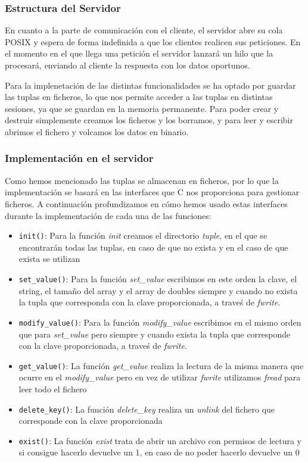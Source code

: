 \documentclass[]{article}
\begin{document}
\subsubsection{Estructura del Servidor}
\label{subsec::estructura_servidor}
En cuanto a la parte de comunicación con el cliente, el servidor abre su cola POSIX y espera de forma indefinida a que los clientes realicen sus peticiones. En el momento en el que llega una petición el servidor lanzará un hilo que la procesará, enviando al cliente la respuesta con los datos oportunos.

Para la implenetación de las distintas funcionalidades se ha optado por guardar las tuplas en ficheros, lo que nos permite acceder a las tuplas en distintas sesiones, ya que se guardan en la memoria permanente.
Para poder crear y destruir simplemente creamos los ficheros y los borramos, y para leer y escribir abrimos el fichero y volcamos los datos en binario.

\subsubsection{Implementación en el servidor}
\label{subsec::implementacion_servidor}
Como hemos mencionado las tuplas se almacenan en ficheros, por lo que la implementación se basará en las interfaces que C nos proporciona para gestionar ficheros.
A continuación profundizamos en cómo hemos usado estas interfaces durante la implementación de cada una de las funciones:

\begin{itemize}
  \item \texttt{init()}: Para la función \textit{init} creamos el directorio \textit{tuple}, en el que se encontrarán todas las tuplas, en caso de que no exista y en el caso de que exista se utilizan 
  \item \texttt{set\_value()}: Para la función \textit{set\_value} escribimos en este orden la clave, el string, el tamaño del array y el array de doubles siempre y cuando no exista la tupla que corresponda con la clave proporcionada, a traveś de \textit{fwrite}.
  \item \texttt{modify\_value()}: Para la función \textit{modify\_value} escribimos en el mismo orden que para \textit{set\_value} pero siempre y cuando exista la tupla que corresponde con la clave proporcionada, a traveś de \textit{fwrite}.
  \item \texttt{get\_value()}: La función \textit{get\_value} realiza la lectura de la misma manera que ocurre en el \textit{modify\_value} pero en vez de utilizar \textit{fwrite} utilizamos \textit{fread} para leer todo el fichero
  \item \texttt{delete\_key()}: La función \textit{delete\_key} realiza un \textit{unlink} del fichero que corresponde con la clave proporcionada
  \item \texttt{exist()}: La función \textit{exist} trata de abrir un archivo con permisos de lectura y si consigue hacerlo devuelve un 1, en caso de no poder hacerlo devuelve un 0
\end{itemize}
\end{document}
